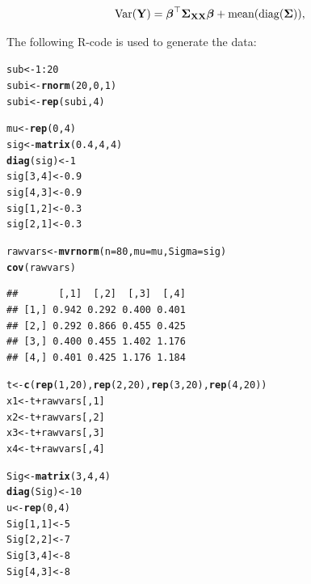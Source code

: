 \documentclass[11pt,a4paper,twoside]{book}\usepackage[]{graphicx}\usepackage[]{color}
\makeatletter
\newcommand{\hlnum}[1]{\textcolor[rgb]{0.686,0.059,0.569}{#1}}%
\newcommand{\hlopt}[1]{\textcolor[rgb]{0,0,0}{#1}}%
\newcommand{\hlstd}[1]{\textcolor[rgb]{0.345,0.345,0.345}{#1}}%
\newcommand{\hlkwb}[1]{\textcolor[rgb]{0.69,0.353,0.396}{#1}}%
\newcommand{\hlkwc}[1]{\textcolor[rgb]{0.333,0.667,0.333}{#1}}%
\newcommand{\hlkwd}[1]{\textcolor[rgb]{0.737,0.353,0.396}{\textbf{#1}}}%
\newenvironment{kframe}{%
 \def\at@end@of@kframe{}%
 \ifinner\ifhmode%
  \def\at@end@of@kframe{\end{minipage}}%
  \begin{minipage}{\columnwidth}%
 \fi\fi%
 \def\FrameCommand##1{\hskip\@totalleftmargin \hskip-\fboxsep
 \colorbox{shadecolor}{##1}\hskip-\fboxsep
     \hskip-\linewidth \hskip-\@totalleftmargin \hskip\columnwidth}%
 \MakeFramed {\advance\hsize-\width
   \@totalleftmargin\z@ \linewidth\hsize
   \@setminipage}}%
 {\par\unskip\endMakeFramed%
 \at@end@of@kframe}
\newenvironment{knitrout}{}{} %
\makeatother
\begin{document}
      \begin{align} 
        \operatorname{Var}({\mathbf{Y}}) = {\boldsymbol{\beta}}^\top {\boldsymbol{\Sigma}}{}_{{\mathbf{X}} {\mathbf{X}}}  {\boldsymbol{\beta}} + \text{mean}(\operatorname{diag}({\boldsymbol{\Sigma}}{})),
   \end{align}

The following R-code is used to generate the data:

\begin{knitrout}
\color{fgcolor}\begin{kframe}
\begin{alltt}
\hlstd{sub}\hlkwb{<-} \hlnum{1}\hlopt{:}\hlnum{20}
\hlstd{subi} \hlkwb{<-} \hlkwd{rnorm}\hlstd{(}\hlnum{20}\hlstd{,} \hlnum{0}\hlstd{,} \hlnum{1}\hlstd{)}
\hlstd{subi}\hlkwb{<-}\hlkwd{rep}\hlstd{(subi,} \hlnum{4}\hlstd{)}

\hlstd{mu} \hlkwb{<-} \hlkwd{rep}\hlstd{(}\hlnum{0}\hlstd{,}\hlnum{4}\hlstd{)}
\hlstd{sig} \hlkwb{<-} \hlkwd{matrix}\hlstd{(}\hlnum{0.4}\hlstd{,} \hlnum{4}\hlstd{,} \hlnum{4}\hlstd{)}
\hlkwd{diag}\hlstd{(sig)} \hlkwb{<-} \hlnum{1}
\hlstd{sig[}\hlnum{3}\hlstd{,}\hlnum{4}\hlstd{]} \hlkwb{<-} \hlnum{0.9}
\hlstd{sig[}\hlnum{4}\hlstd{,}\hlnum{3}\hlstd{]} \hlkwb{<-} \hlnum{0.9}
\hlstd{sig[}\hlnum{1}\hlstd{,}\hlnum{2}\hlstd{]} \hlkwb{<-} \hlnum{0.3}
\hlstd{sig[}\hlnum{2}\hlstd{,}\hlnum{1}\hlstd{]} \hlkwb{<-} \hlnum{0.3}

\hlstd{rawvars} \hlkwb{<-} \hlkwd{mvrnorm}\hlstd{(}\hlkwc{n}\hlstd{=}\hlnum{80}\hlstd{,} \hlkwc{mu}\hlstd{=mu,} \hlkwc{Sigma}\hlstd{=sig)}
\hlkwd{cov}\hlstd{(rawvars)}
\end{alltt}
\begin{verbatim}
##       [,1]  [,2]  [,3]  [,4]
## [1,] 0.942 0.292 0.400 0.401
## [2,] 0.292 0.866 0.455 0.425
## [3,] 0.400 0.455 1.402 1.176
## [4,] 0.401 0.425 1.176 1.184
\end{verbatim}
\begin{alltt}
\hlstd{t} \hlkwb{<-} \hlkwd{c}\hlstd{(}\hlkwd{rep}\hlstd{(}\hlnum{1}\hlstd{,} \hlnum{20}\hlstd{),}\hlkwd{rep}\hlstd{(}\hlnum{2}\hlstd{,}\hlnum{20}\hlstd{),} \hlkwd{rep}\hlstd{(}\hlnum{3}\hlstd{,} \hlnum{20}\hlstd{),} \hlkwd{rep}\hlstd{(}\hlnum{4}\hlstd{,} \hlnum{20}\hlstd{))}
\hlstd{x1} \hlkwb{<-} \hlstd{t}\hlopt{+}\hlstd{rawvars[,}\hlnum{1}\hlstd{]}
\hlstd{x2} \hlkwb{<-} \hlstd{t}\hlopt{+}\hlstd{rawvars[,}\hlnum{2}\hlstd{]}
\hlstd{x3} \hlkwb{<-} \hlstd{t}\hlopt{+}\hlstd{rawvars[,}\hlnum{3}\hlstd{]}
\hlstd{x4} \hlkwb{<-} \hlstd{t}\hlopt{+}\hlstd{rawvars[,}\hlnum{4}\hlstd{]}

\hlstd{Sig}\hlkwb{<-} \hlkwd{matrix}\hlstd{(}\hlnum{3}\hlstd{,} \hlnum{4}\hlstd{,}\hlnum{4}\hlstd{)}
\hlkwd{diag}\hlstd{(Sig)} \hlkwb{<-} \hlnum{10}
\hlstd{u} \hlkwb{<-} \hlkwd{rep}\hlstd{(}\hlnum{0}\hlstd{,} \hlnum{4}\hlstd{)}
\hlstd{Sig[}\hlnum{1}\hlstd{,}\hlnum{1}\hlstd{]} \hlkwb{<-} \hlnum{5}
\hlstd{Sig[}\hlnum{2}\hlstd{,}\hlnum{2}\hlstd{]} \hlkwb{<-} \hlnum{7}
\hlstd{Sig[}\hlnum{3}\hlstd{,}\hlnum{4}\hlstd{]} \hlkwb{<-} \hlnum{8}
\hlstd{Sig[}\hlnum{4}\hlstd{,}\hlnum{3}\hlstd{]} \hlkwb{<-} \hlnum{8}


\end{alltt}
\end{kframe}
\end{knitrout}
\end{document}
